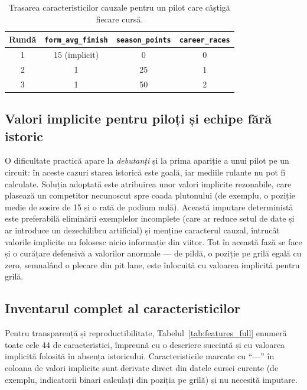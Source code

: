 \documentclass[12pt,a4paper]{report}
\begin{document}
\begin{table}[htbp]
  \centering
  \begin{tabular}{c c c c}
    \toprule
    \textbf{Rundă} & \textbf{\texttt{form\_avg\_finish}} & \textbf{\texttt{season\_points}} & \textbf{\texttt{career\_races}} \\
    \midrule
    1 & 15 (implicit) & 0  & 0 \\
    2 & 1             & 25 & 1 \\
    3 & 1             & 50 & 2 \\
    \bottomrule
  \end{tabular}
  \caption{Trasarea caracteristicilor cauzale pentru un pilot care câștigă fiecare cursă.}
  \label{tab:trasare}
\end{table}

\subsection{Valori implicite pentru piloți și echipe fără istoric}

O dificultate practică apare la \emph{debutanți} și la prima apariție a unui pilot pe un circuit:
în aceste cazuri starea istorică este goală, iar mediile rulante nu pot fi calculate. Soluția
adoptată este atribuirea unor valori implicite rezonabile, care plasează un competitor necunoscut
spre coada plutonului (de exemplu, o poziție medie de sosire de 15 și o rată de podium nulă). Această
imputare deterministă este preferabilă eliminării exemplelor incomplete (care ar reduce setul de
date și ar introduce un dezechilibru artificial) și menține caracterul cauzal, întrucât valorile
implicite nu folosesc nicio informație din viitor. Tot în această fază se face și o curățare
defensivă a valorilor anormale --- de pildă, o poziție pe grilă egală cu zero, semnalând o plecare
din pit lane, este înlocuită cu valoarea implicită pentru grilă.

\subsection{Inventarul complet al caracteristicilor}

Pentru transparență și reproductibilitate, Tabelul~\ref{tab:features_full} enumeră toate cele 44 de
caracteristici, împreună cu o descriere succintă și cu valoarea implicită folosită în absența
istoricului. Caracteristicile marcate cu ``---'' în coloana de valori implicite sunt derivate
direct din datele cursei curente (de exemplu, indicatorii binari calculați din poziția pe grilă)
și nu necesită imputare.
\end{document}
